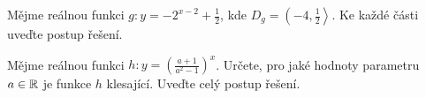 \documentclass[12pt,a4paper]{exam}
\begin{document}
\begin{questions}
        \question[6] Mějme reálnou funkci $\displaystyle g: y=-2^{x-2}+\frac{1}{2}$, kde $\displaystyle D_g=\left(-4,\frac{1}{2}\right\rangle$. Ke každé části uveďte postup řešení. 

        \newpage

        \bonusquestion[4] Mějme reálnou funkci $\displaystyle h: y=\left(\frac{a+1}{a^2-1}\right)^x$. Určete, pro jaké hodnoty parametru $a\in\mathbb{R}$ je funkce $h$ klesající. Uveďte celý postup řešení.

    \end{questions}
\end{document}
